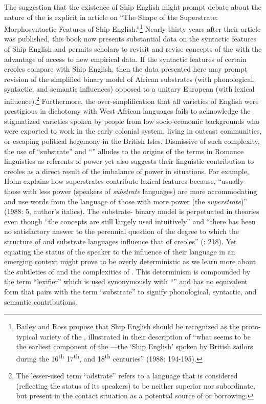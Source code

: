 The suggestion that the existence of Ship English might prompt debate about the nature of the  is explicit in  article on “The Shape of the Superstrate: Morphosyntactic Features of Ship English.”\footnote{Bailey and Ross propose that Ship English should be recognized as the proto-typical variety of the , illustrated in their description of “what seems to be the earliest component of the —the ‘Ship English’ spoken by British sailors during the 16\textsuperscript{th} 17\textsuperscript{th}, and 18\textsuperscript{th} centuries” (1988: 194-195).}  Nearly thirty years after their article was published, this book now presents substantial data on the syntactic features of Ship English and permits scholars to revisit and revise concepts of the  with the advantage of access to new empirical data. If the syntactic features of certain creoles compare with Ship English, then the data presented here may prompt revision of the simplified binary model of African substrates (with phonological, syntactic, and semantic influences) opposed to a unitary European  (with lexical influence).\footnote{The lesser-used term “adstrate” refers to a language that is considered (reflecting the status of its speakers) to be neither superior nor subordinate, but present in the contact situation as a potential source of  or borrowing.}  Furthermore, the over-simplification that all varieties of English were prestigious in dichotomy with West African languages fails to acknowledge the stigmatized varieties spoken by people from low socio-economic backgrounds who were exported to work in the early colonial system, living in outcast communities, or escaping political hegemony in the British Isles. Dismissive of such complexity, the use of “substrate” and “” alludes to the origins of the terms in Romance linguistics as referents of power yet also suggests their linguistic contribution to creoles as a direct result of the imbalance of power in  situations. For example, Holm explains how superstrates contribute lexical features because, “usually those with less power (speakers of \textit{substrate} languages) are more accommodating and use words from the language of those with more power (the \textit{superstrate})” (1988: 5, author’s italics). The substrate- binary model is perpetuated in  theories even though “the concepts are still largely used intuitively” \citep[55]{Selbach2008} and “there has been no satisfactory answer to the perennial question of the degree to which the structure of  and substrate languages influence that of creoles” (\citealt{Holm2009}: 218). Yet equating the status of the speaker to the influence of their language in an emerging  context might prove to be overly deterministic as we learn more about the subtleties of  and the complexities of . This determinism is compounded by the term “lexifier” which is used synonymously with “” and has no equivalent form that pairs with the term “substrate” to signify phonological, syntactic, and semantic contributions. 